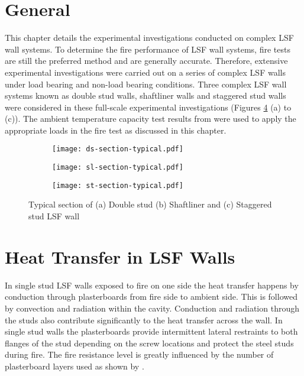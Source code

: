 \section{General}
This chapter details the experimental investigations conducted on complex LSF wall systems. To determine the fire performance of LSF wall systems, fire tests are still the preferred method and are generally accurate. Therefore, extensive experimental investigations were carried out on a series of complex LSF walls under load bearing and non-load bearing conditions. Three complex LSF wall systems known as double stud walls, shaftliner walls and staggered stud walls were considered in these full-scale experimental investigations (Figures \ref{fig:typical-complex-section} (a) to (c)). The ambient temperature capacity test results from  were used to apply the appropriate loads in the fire test as discussed in this chapter.
\begin{figure}[!htbp]
	\centering
	\begin{subfigure}[b]{0.5\textwidth}
		\centering
		\texttt{[image: ds-section-typical.pdf]}
		\caption{}
		\label{subfig:ds-section}
	\end{subfigure}
	\begin{subfigure}[b]{0.5\textwidth}
		\centering
		\texttt{[image: sl-section-typical.pdf]}
		\caption{}
		\label{subfig:sl-section}
	\end{subfigure}
	\begin{subfigure}[b]{0.6\textwidth}
		\centering
		\texttt{[image: st-section-typical.pdf]}
		\caption{}
		\label{subfig:st-section}
	\end{subfigure}
	   \caption{Typical section of (a) Double stud (b) Shaftliner and (c) Staggered stud LSF wall}
	   \label{fig:typical-complex-section}
\end{figure}

\section{Heat Transfer in LSF Walls}

In single stud LSF walls exposed to fire on one side the heat transfer happens by conduction through plasterboards from fire side to ambient side. This is followed by convection and radiation within the cavity. Conduction and radiation through the studs also contribute significantly to the heat transfer across the wall. In single stud walls the plasterboards provide intermittent lateral restraints to both flanges of the stud depending on the screw locations and protect the steel studs during fire. The fire resistance level is greatly influenced by the number of plasterboard layers used as shown by \citet{Kodur2006,Ariyanayagam2016}. 

